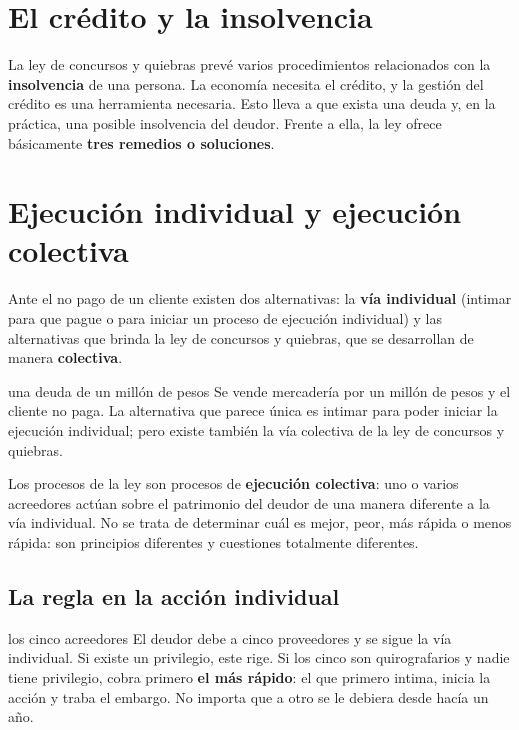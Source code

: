 \documentclass[12pt,oneside]{book}
\begin{document}
\section{El crédito y la insolvencia}

La ley de concursos y quiebras prevé varios procedimientos relacionados con la \textbf{insolvencia} de una persona. La economía necesita el crédito, y la gestión del crédito es una herramienta necesaria. Esto lleva a que exista una deuda y, en la práctica, una posible insolvencia del deudor. Frente a ella, la ley ofrece básicamente \textbf{tres remedios o soluciones}.

\section{Ejecución individual y ejecución colectiva}

Ante el no pago de un cliente existen dos alternativas: la \textbf{vía individual} (intimar para que pague o para iniciar un proceso de ejecución individual) y las alternativas que brinda la ley de concursos y quiebras, que se desarrollan de manera \textbf{colectiva}.

\begin{example}{una deuda de un millón de pesos}
Se vende mercadería por un millón de pesos y el cliente no paga. La alternativa que parece única es intimar para poder iniciar la ejecución individual; pero existe también la vía colectiva de la ley de concursos y quiebras.
\end{example}

Los procesos de la ley son procesos de \textbf{ejecución colectiva}: uno o varios acreedores actúan sobre el patrimonio del deudor de una manera diferente a la vía individual. No se trata de determinar cuál es mejor, peor, más rápida o menos rápida: son principios diferentes y cuestiones totalmente diferentes.

\subsection{La regla en la acción individual}

\begin{example}{los cinco acreedores}
El deudor debe a cinco proveedores y se sigue la vía individual. Si existe un privilegio, este rige. Si los cinco son quirografarios y nadie tiene privilegio, cobra primero \textbf{el más rápido}: el que primero intima, inicia la acción y traba el embargo. No importa que a otro se le debiera desde hacía un año.
\end{example}
\end{document}
